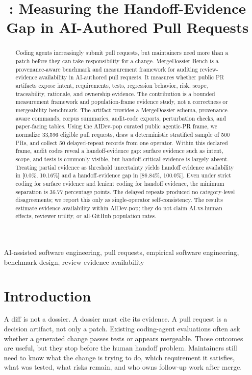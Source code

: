\documentclass[10pt,conference]{IEEEtran}
\title{\tool: Measuring the Handoff-Evidence Gap in AI-Authored Pull Requests}
\author{
\IEEEauthorblockN{Anonymous Author(s)}
}
\newcommand{\tool}{MergeDossier-Bench}
\newcommand{\slogan}{A diff is not a dossier.}
\newcommand{\provslogan}{A dossier must cite its evidence.}
\begin{document}
\maketitle

\begin{abstract}
Coding agents increasingly submit pull requests, but maintainers need more than a patch before they can take responsibility for a change.
\tool{} is a provenance-aware benchmark and measurement framework for auditing review-evidence availability in AI-authored pull requests.
It measures whether public PR artifacts expose intent, requirements, tests, regression behavior, risk, scope, traceability, rationale, and ownership evidence.
The contribution is a bounded measurement framework and population-frame evidence study, not a correctness or mergeability benchmark.
The artifact provides a MergeDossier schema, provenance-aware commands, corpus summaries, audit-code exports, perturbation checks, and paper-facing tables.
Using the AIDev-pop curated public agentic-PR frame, we normalize 33,596 eligible pull requests, draw a deterministic stratified sample of 500 PRs, and collect 50 delayed-repeat records from one operator.
Within this declared frame, audit codes reveal a handoff-evidence gap: surface evidence such as intent, scope, and tests is commonly visible, but handoff-critical evidence is largely absent.
Treating partial evidence as threshold uncertainty yields handoff evidence availability in [0.0\%, 10.16\%] and a handoff-evidence gap in [89.84\%, 100.0\%].
Even under strict coding for surface evidence and lenient coding for handoff evidence, the minimum separation is 36.77 percentage points.
The delayed repeats produced no category-level disagreements; we report this only as single-operator self-consistency.
The results estimate evidence availability within AIDev-pop; they do not claim AI-vs-human effects, reviewer utility, or all-GitHub population rates.
\end{abstract}

\begin{IEEEkeywords}
AI-assisted software engineering, pull requests, empirical software engineering, benchmark design, review-evidence availability
\end{IEEEkeywords}

\section{Introduction}

\slogan{} \provslogan{} A pull request is a decision artifact, not only a patch.
Existing coding-agent evaluations often ask whether a generated change passes tests or appears mergeable.
Those outcomes are useful, but they stop before the human handoff problem.
Maintainers still need to know what the change is trying to do, which requirement it satisfies, what was tested, what risks remain, and who owns follow-up work after merge.
\end{document}
